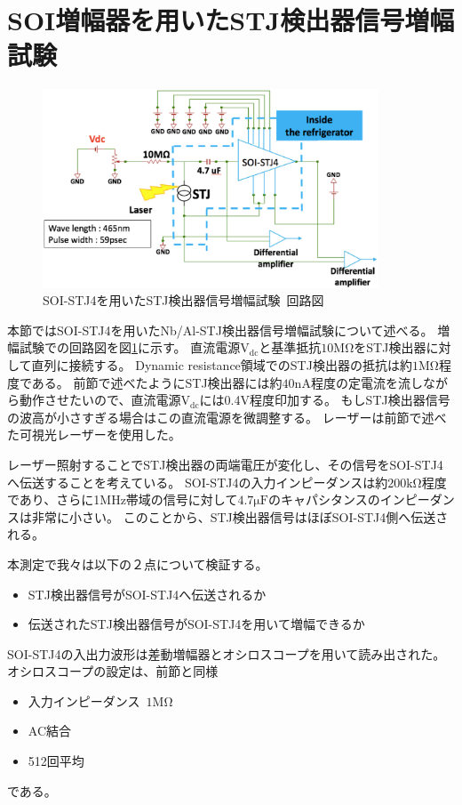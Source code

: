 	\section{SOI増幅器を用いたSTJ検出器信号増幅試験}
		\begin{figure}[htbp]
			\begin{center}
				\includegraphics[width=10.0cm]{./Chapter/Chapter4/Picture/STJamp_circuit.eps}
				\caption{SOI-STJ4を用いたSTJ検出器信号増幅試験\ 回路図}
				\label{fig:STJamp_circuit}
			\end{center}
		\end{figure}
		本節ではSOI-STJ4を用いたNb/Al-STJ検出器信号増幅試験について述べる。
		増幅試験での回路図を図\ref{fig:STJamp_circuit}に示す。
		直流電源$\mathrm{V_{dc}}$と基準抵抗$10\mathrm{M\Omega}$をSTJ検出器に対して直列に接続する。
		Dynamic resistance領域でのSTJ検出器の抵抗は約$1\mathrm{M\Omega}$程度である。
		前節で述べたようにSTJ検出器には約$40\mathrm{nA}$程度の定電流を流しながら動作させたいので、直流電源$\mathrm{V_{dc}}$には0.4V程度印加する。
		もしSTJ検出器信号の波高が小さすぎる場合はこの直流電源を微調整する。
		レーザーは前節で述べた可視光レーザーを使用した。

		レーザー照射することでSTJ検出器の両端電圧が変化し、その信号をSOI-STJ4へ伝送することを考えている。
		SOI-STJ4の入力インピーダンスは約$200\mathrm{k\Omega}$程度であり、さらに1MHz帯域の信号に対して$4.7\mathrm{\mu F}$のキャパシタンスのインピーダンスは非常に小さい。
		このことから、STJ検出器信号はほぼSOI-STJ4側へ伝送される。
		
		本測定で我々は以下の２点について検証する。
		\begin{itemize}
			\item STJ検出器信号がSOI-STJ4へ伝送されるか
			\item 伝送されたSTJ検出器信号がSOI-STJ4を用いて増幅できるか
		\end{itemize}
		
		SOI-STJ4の入出力波形は差動増幅器とオシロスコープを用いて読み出された。
		オシロスコープの設定は、前節と同様
		\begin{itemize}
			\item 入力インピーダンス\ $1\mathrm{M \Omega}$
			\item AC結合
			\item 512回平均
		\end{itemize}
		である。
		
